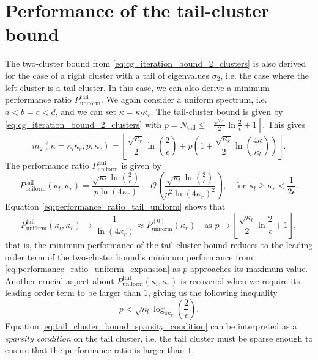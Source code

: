 \section{Performance of the tail-cluster bound}\label{sec:tail_cluster_bound_performance}
The two-cluster bound from \cref{eq:cg_iteration_bound_2_clusters} is also derived for the case of a right cluster with a tail of eigenvalues $\sigma_2$, i.e. the case where the left cluster is a tail cluster. In this case, we can also derive a minimum performance ratio $P^{\text{tail}}_{\text{uniform}}$. We again consider a uniform spectrum, i.e. $a<b=c<d$, and we can set $\kappa=\kappa_l\kappa_r$. The tail-cluster bound is given by \cref{eq:cg_iteration_bound_2_clusters} with $p = N_{\text{tail}} \leq \left\lfloor\frac{\sqrt{\kappa_l}}{2}\ln{\frac{2}{\epsilon}} + 1 \right\rfloor $. This gives
\[
    m_2(\kappa=\kappa_l\kappa_r, p, \kappa_r) = \left\lfloor
        \frac{\sqrt{\kappa_r}}{2}\ln\left(\frac{2}{\epsilon}\right) 
        + p \left(
            1 + \frac{\sqrt{\kappa_r}}{2}\ln\left(\frac{4\kappa}{\kappa_l}\right)
        \right)
    \right\rfloor.
\]
The performance ratio $P^{\text{tail}}_{\text{uniform}}$ is given by
\begin{equation}
    P^{\text{tail}}_{\text{uniform}}(\kappa_l, \kappa_r) = \frac{\sqrt{\kappa_l}\ln\left(\frac{2}{\epsilon}\right)}{p\ln(4\kappa_r)} - \mathcal{O}\left(\frac{\sqrt{\kappa_l}\ln\left(\frac{2}{\epsilon}\right)}{p^2\ln(4\kappa_r)^2}\right), \quad \text{for } \kappa_l \geq \kappa_r < \frac{1}{2\epsilon}.
    \label{eq:performance_ratio_tail_uniform}
\end{equation}
Equation \ref{eq:performance_ratio_tail_uniform} shows that
\[
    P^{\text{tail}}_{\text{uniform}}(\kappa_l, \kappa_r) \longrightarrow \frac{1}{\ln(4\kappa_r)} \approx P^{(0)}_{\text{uniform}}(\kappa_r) \quad \text{as } p \to \left\lfloor\frac{\sqrt{\kappa_l}}{2}\ln{\frac{2}{\epsilon}} + 1 \right\rfloor,
\]
that is, the minimum performance of the tail-cluster bound reduces to the leading order term of the two-cluster bound's minimum performance from \cref{eq:performance_ratio_uniform_expansion} as $p$ approaches its maximum value. Another crucial aspect about $P^{\text{tail}}_{\text{uniform}}(\kappa_l, \kappa_r)$ is recovered when we require its leading order term to be larger than $1$, giving us the following inequality
\begin{equation}
    p < \sqrt{\kappa_l}\log_{4\kappa_r}\left(\frac{2}{\epsilon}\right).
    \label{eq:tail_cluster_bound_sparsity_condition}
\end{equation}
Equation \ref{eq:tail_cluster_bound_sparsity_condition} can be interpreted as a \textit{sparsity condition} on the tail cluster, i.e. the tail cluster must be sparse enough to ensure that the performance ratio is larger than $1$.

